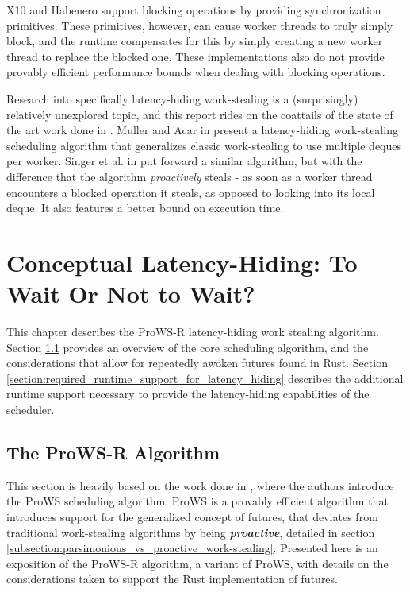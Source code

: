 \documentclass[bsc,frontabs,singlespacing,parskip,deptreport,normalheadings]{infthesis}
\begin{document}
X10 \cite{charles_x10_2005} and Habenero \cite{cave_habanero-java_2011} support
blocking operations by providing synchronization primitives. These primitives,
however, can cause worker threads to truly simply block, and the runtime
compensates for this by simply creating a new worker thread to replace the
blocked one. These implementations also do not provide provably efficient
performance bounds when dealing with blocking operations.

Research into specifically latency-hiding work-stealing is a (surprisingly)
relatively unexplored topic, and this report rides on the coattails of the state
of the art work done in \cite{muller_latency-hiding_2016,
singer_proactive_2019}. Muller and Acar in \cite{muller_latency-hiding_2016}
present a latency-hiding work-stealing scheduling algorithm that generalizes
classic work-stealing to use multiple deques per worker. Singer et al. in
\cite{singer_proactive_2019} put forward a similar algorithm, but with the
difference that the algorithm \textit{proactively} steals - as soon as a worker
thread encounters a blocked operation it steals, as opposed to looking into its
local deque. It also features a better bound on execution time.


\chapter{Conceptual Latency-Hiding: To Wait Or Not to Wait?}
\label{chapter:conceptual_latency-hiding:_to_wait_or_not_to_wait?}

This chapter describes the ProWS-R latency-hiding work stealing algorithm.
Section \ref{section:overview_of_the_prows_algorithm} provides an overview of
the core scheduling algorithm, and the considerations that allow for repeatedly
awoken futures found in Rust. Section
\ref{section:required_runtime_support_for_latency_hiding} describes the
additional runtime support necessary to provide the latency-hiding capabilities
of the scheduler.

\section{The ProWS-R Algorithm}
\label{section:overview_of_the_prows_algorithm}

This section is heavily based on the work done in \cite{singer_proactive_2019},
where the authors introduce the ProWS scheduling algorithm. ProWS is a provably
efficient algorithm that introduces support for the generalized concept of
futures, that deviates from traditional work-stealing algorithms by being
\textit{\textbf{proactive}}, detailed in section 
\ref{subsection:parsimonious_vs_proactive_work-stealing}. Presented here is an
exposition of the ProWS-R algorithm, a variant of ProWS, with details on the
considerations taken to support the Rust implementation of futures.
\end{document}
